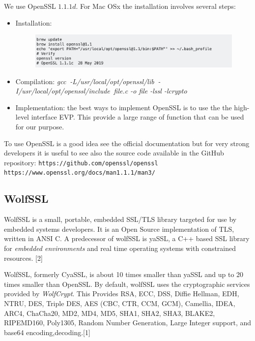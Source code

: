 \documentclass[11pt]{article}
\begin{document}
We use OpenSSL $1.1.1d$. For Mac OSx the installation involves several steps:
\begin{itemize}
\item Installation:
\begin{figure}[!ht]
  \includegraphics[width=1\textwidth]{pic1-hw4-1635747}
  \label{fig:OpenSSL Mac Installation}
\end{figure}

\item Compilation:\newline
{\em gcc$\;\;$-L/usr/local/opt/openssl/lib$\;\;$-I/usr/local/opt/openssl/include$\;\;$file.c -o file -lssl -lcrypto}
\item Implementation: the best ways to implement OpenSSL is to use the the high-level interface EVP. This provide a large range of function that can be used for our purpose.

\end{itemize}

To use OpenSSL is a good idea see the official documentation but for very strong developers it is useful to see also the source code available in the GitHub repository:\newline
\verb|https://github.com/openssl/openssl|\newline
\verb|https://www.openssl.org/docs/man1.1.1/man3/|

\subsection{WolfSSL}
WolfSSL is a small, portable, embedded SSL/TLS library targeted for use by embedded systems developers. It is an Open Source implementation of TLS, written in ANSI C. A predecessor of wolfSSL is yaSSL, a C++ based SSL library for {\em embedded environments} and real time operating systems with constrained resources. [2]

WolfSSL, formerly CyaSSL, is about 10 times smaller than yaSSL and up to 20 times smaller than OpenSSL. By default, wolfSSL uses the cryptographic services provided by {\em WolfCrypt}. This Provides RSA, ECC, DSS, Diffie Hellman, EDH, NTRU, DES, Triple DES, AES (CBC, CTR, CCM, GCM), Camellia, IDEA, ARC4, ChaCha20, MD2, MD4, MD5, SHA1, SHA2, SHA3, BLAKE2, RIPEMD160, Poly1305, Random Number Generation, Large Integer support, and base64 encoding,decoding.[1]
\end{document}
